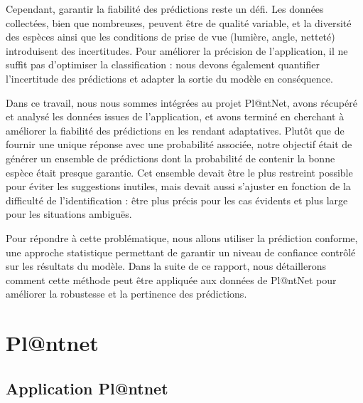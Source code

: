 \documentclass[a4paper,12pt]{article}
\begin{document}
\vspace{0.2cm}

Cependant, garantir la fiabilité des prédictions reste un défi. Les données collectées, bien que nombreuses, peuvent être de qualité variable, et la diversité des espèces ainsi que les conditions de prise de vue (lumière, angle, netteté) introduisent des incertitudes. Pour améliorer la précision de l'application, il ne suffit pas d’optimiser la classification : nous devons également quantifier l’incertitude des prédictions et adapter la sortie du modèle en conséquence.

\vspace{0.2cm}

Dans ce travail, nous nous sommes intégrées au projet Pl@ntNet, avons récupéré et analysé les données issues de l’application, et avons terminé en cherchant à améliorer la fiabilité des prédictions en les rendant adaptatives. Plutôt que de fournir une unique réponse avec une probabilité associée, notre objectif était de générer un ensemble de prédictions dont la probabilité de contenir la bonne espèce était presque garantie. Cet ensemble devait être le plus restreint possible pour éviter les suggestions inutiles, mais devait aussi s’ajuster en fonction de la difficulté de l’identification : être plus précis pour les cas évidents et plus large pour les situations ambiguës.

\vspace{0.2cm}

Pour répondre à cette problématique, nous allons utiliser la prédiction conforme, une approche statistique permettant de garantir un niveau de confiance contrôlé sur les résultats du modèle. Dans la suite de ce rapport, nous détaillerons comment cette méthode peut être appliquée aux données de Pl@ntNet pour améliorer la robustesse et la pertinence des prédictions.


\section{Pl@ntnet}


\subsection{Application Pl@ntnet}
\end{document}

